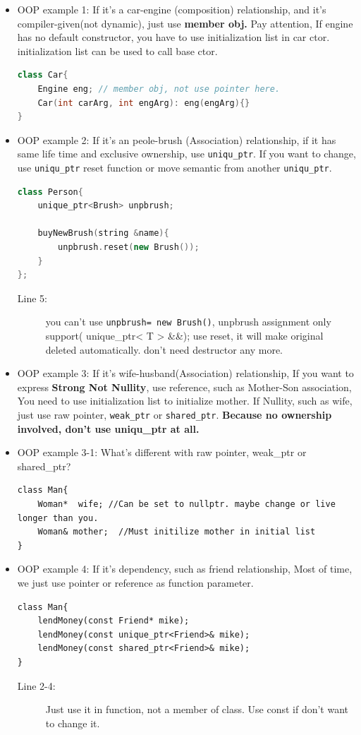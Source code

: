\documentclass[a4paper,11pt,twoside]{book}
\begin{document}
\begin{itemize}
	\item OOP example 1: If it's a car-engine (composition) relationship, and it's compiler-given(not dynamic), just use \textbf{member obj.}   Pay attention, If engine has no default constructor, you have to use initialization list in car ctor.  initialization list can be used to call base ctor.
\begin{lstlisting}[frame=single, language=c++]
class Car{
	Engine eng; // member obj, not use pointer here.
	Car(int carArg, int engArg): eng(engArg){}
}
	\end{lstlisting}
		
	\item OOP example 2:  If it's an peole-brush (Association) relationship, if it has same life time and exclusive ownership, use \texttt{uniqu\_ptr}. If you want to change, use \texttt{uniqu\_ptr} reset function or move semantic from another \texttt{uniqu\_ptr}.
\begin{lstlisting}[frame=single, language=c++]
class Person{
	unique_ptr<Brush> unpbrush;
	
	buyNewBrush(string &name){
		unpbrush.reset(new Brush());
	}
};
\end{lstlisting}
\begin{description}
	\item[Line 5:] you can't use \texttt{unpbrush= new Brush()}, unpbrush assignment only support( unique\_ptr< T > \&\&); use reset, it will make original deleted automatically. don't need destructor any more.
\end{description}
	
	\item OOP example 3: If it's wife-husband(Association) relationship, If you want to express \textbf{Strong Not Nullity}, use reference, such as Mother-Son association, You need to use initialization list to initialize mother. If Nullity, such as wife, just use raw pointer, \texttt{weak\_ptr} or \texttt{shared\_ptr}. \textbf{Because no ownership involved, don't use uniqu\_ptr at all. }
	
	\item OOP example 3-1: What's different with raw pointer, weak\_ptr or shared\_ptr?
	\begin{lstlisting}[]
class Man{
	Woman*  wife; //Can be set to nullptr. maybe change or live longer than you.
	Woman& mother;  //Must initilize mother in initial list
}
\end{lstlisting}

	
	\item OOP example 4: If it's dependency,  such as friend relationship,  Most of time, we just use pointer or reference as function parameter.
\begin{lstlisting}[]
class Man{
	lendMoney(const Friend* mike);
	lendMoney(const unique_ptr<Friend>& mike);
	lendMoney(const shared_ptr<Friend>& mike);
}
\end{lstlisting}
\begin{description}
	\item[Line 2-4:] Just use it in function, not a member of class. Use const if don't want to change it.
\end{description}
	

\end{itemize}
\end{document}
